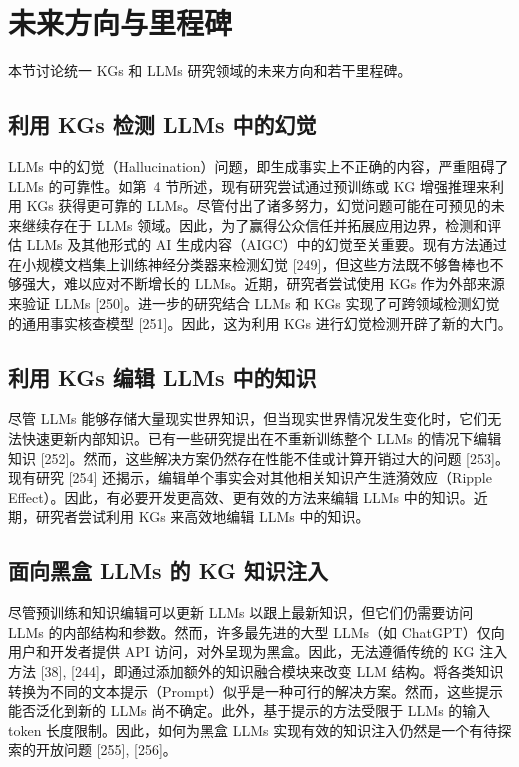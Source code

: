 \documentclass[11pt,UTF8,fontset=fandol]{ctexart}
\begin{document}
\section{未来方向与里程碑}

本节讨论统一 KGs 和 LLMs 研究领域的未来方向和若干里程碑。

\subsection{利用 KGs 检测 LLMs 中的幻觉}

LLMs 中的幻觉（Hallucination）问题，即生成事实上不正确的内容，严重阻碍了 LLMs 的可靠性。如第~4 节所述，现有研究尝试通过预训练或 KG 增强推理来利用 KGs 获得更可靠的 LLMs。尽管付出了诸多努力，幻觉问题可能在可预见的未来继续存在于 LLMs 领域。因此，为了赢得公众信任并拓展应用边界，检测和评估 LLMs 及其他形式的 AI 生成内容（AIGC）中的幻觉至关重要。现有方法通过在小规模文档集上训练神经分类器来检测幻觉 [249]，但这些方法既不够鲁棒也不够强大，难以应对不断增长的 LLMs。近期，研究者尝试使用 KGs 作为外部来源来验证 LLMs [250]。进一步的研究结合 LLMs 和 KGs 实现了可跨领域检测幻觉的通用事实核查模型 [251]。因此，这为利用 KGs 进行幻觉检测开辟了新的大门。

\subsection{利用 KGs 编辑 LLMs 中的知识}

尽管 LLMs 能够存储大量现实世界知识，但当现实世界情况发生变化时，它们无法快速更新内部知识。已有一些研究提出在不重新训练整个 LLMs 的情况下编辑知识 [252]。然而，这些解决方案仍然存在性能不佳或计算开销过大的问题 [253]。现有研究 [254] 还揭示，编辑单个事实会对其他相关知识产生涟漪效应（Ripple Effect）。因此，有必要开发更高效、更有效的方法来编辑 LLMs 中的知识。近期，研究者尝试利用 KGs 来高效地编辑 LLMs 中的知识。

\subsection{面向黑盒 LLMs 的 KG 知识注入}

尽管预训练和知识编辑可以更新 LLMs 以跟上最新知识，但它们仍需要访问 LLMs 的内部结构和参数。然而，许多最先进的大型 LLMs（如 ChatGPT）仅向用户和开发者提供 API 访问，对外呈现为黑盒。因此，无法遵循传统的 KG 注入方法 [38], [244]，即通过添加额外的知识融合模块来改变 LLM 结构。将各类知识转换为不同的文本提示（Prompt）似乎是一种可行的解决方案。然而，这些提示能否泛化到新的 LLMs 尚不确定。此外，基于提示的方法受限于 LLMs 的输入 token 长度限制。因此，如何为黑盒 LLMs 实现有效的知识注入仍然是一个有待探索的开放问题 [255], [256]。
\end{document}
